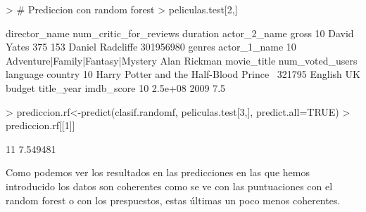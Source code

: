 \documentclass[a4paper]{article}
\begin{document}
\begin{Schunk}
\begin{Sinput}
> # Prediccion con random forest
> peliculas.test[2,]
\end{Sinput}
\begin{Soutput}
   director_name num_critic_for_reviews duration     actor_2_name     gross
10   David Yates                    375      153 Daniel Radcliffe 301956980
                             genres actor_1_name
10 Adventure|Family|Fantasy|Mystery Alan Rickman
                               movie_title num_voted_users language country
10 Harry Potter and the Half-Blood Prince           321795  English      UK
    budget title_year imdb_score
10 2.5e+08       2009        7.5
\end{Soutput}
\begin{Sinput}
> prediccion.rf<-predict(clasif.randomf, peliculas.test[3,], predict.all=TRUE)
> prediccion.rf[[1]]
\end{Sinput}
\begin{Soutput}
      11 
7.549481 
\end{Soutput}
\end{Schunk}

Como podemos ver los resultados en las predicciones en las que hemos introducido los datos son coherentes como se ve con las puntuaciones con el random forest o con los prespuestos, estas últimas un poco menos coherentes.
\end{document}
